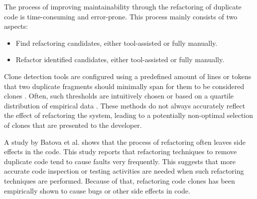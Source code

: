 The process of improving maintainability through the refactoring of duplicate code is time-consuming and error-prone. This process mainly consists of two aspects:
\begin{itemize}
	\item Find refactoring candidates, either tool-assisted or fully manually.
	\item Refactor identified candidates, either tool-assisted or fully manually.
\end{itemize}
Clone detection tools are configured using a predefined amount of lines or tokens that two duplicate fragments should minimally span for them to be considered clones \cite{sajnani2016sourcerercc, svajlenko2016bigcloneeval}. Often, such thresholds are intuitively chosen \cite{li2006cp, roy2009mutation} or based on a quartile distribution of empirical data \cite{alves2010deriving}. These methods do not always accurately reflect the effect of refactoring the system, leading to a potentially non-optimal selection of clones that are presented to the developer.

A study by Batova et al. \cite{bavota2012does} shows that the process of refactoring often leaves side effects in the code. This study reports that refactoring techniques to remove duplicate code tend to cause faults very frequently. This suggests that more accurate code inspection or testing activities are needed when such refactoring techniques are performed. Because of that, refactoring code clones has been empirically shown to cause bugs or other side effects in code.

